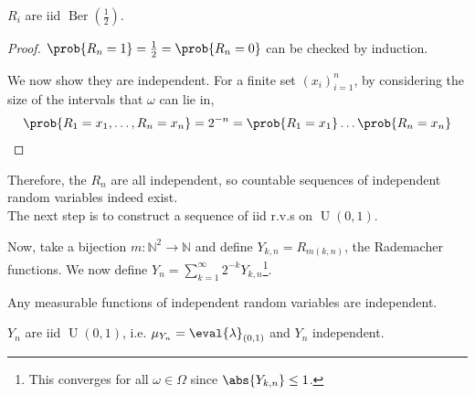 \begin{claim}
	$R_i$ are iid $\operatorname{Ber}(\frac{1}{2})$.
\end{claim}

\begin{proof}
	$\prob{R_n = 1} = \frac{1}{2} = \prob{R_n = 0}$ can be checked by induction.

	We now show they are independent.
	For a finite set $(x_i)_{i=1}^n$, by considering the size of the intervals that $\omega$ can lie in,
	\begin{align*}
		\prob{R_1 = x_1, \dots, R_n = x_n} = 2^{-n} = \prob{R_1 = x_1} \dots \prob{R_n = x_n}
	\end{align*}
\end{proof}

Therefore, the $R_n$ are all independent, so countable sequences of independent random variables indeed exist. \\
The next step is to construct a sequence of iid r.v.s on $\operatorname{U}(0, 1)$.

Now, take a bijection $m \colon \mathbb N^2 \to \mathbb N$ and define $Y_{k,n} = R_{m(k, n)}$, the Rademacher functions.
We now define $Y_n = \sum_{k=1}^\infty 2^{-k} Y_{k,n}$\footnote{This converges for all $\omega \in \Omega$ since $\abs{Y_{k,n}} \leq 1$.}.

\begin{lemma}
	Any measurable functions of independent random variables are independent.
\end{lemma}

\begin{claim}
	$Y_n$ are iid $\operatorname{U}(0, 1)$, i.e. $\mu_{Y_n} = \eval{\lambda}_{(0, 1)}$ and $Y_n$ independent.
\end{claim}

